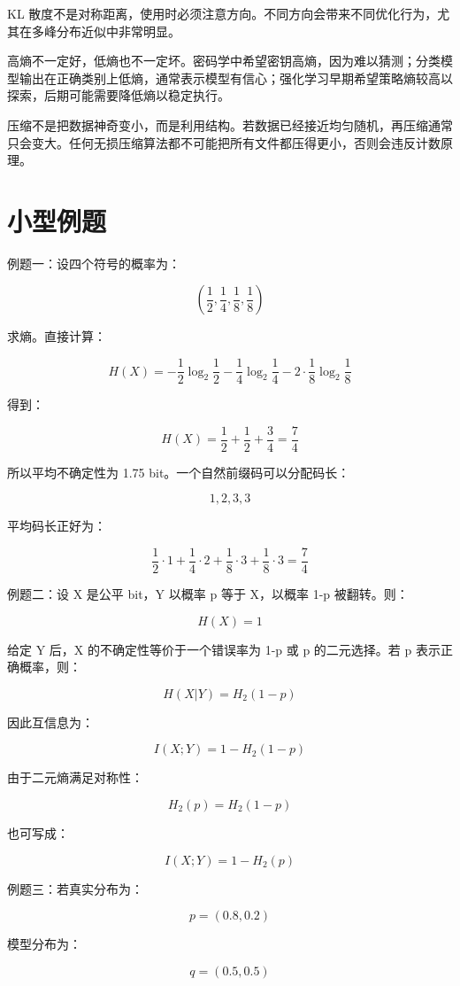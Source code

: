 KL 散度不是对称距离，使用时必须注意方向。不同方向会带来不同优化行为，尤其在多峰分布近似中非常明显。

高熵不一定好，低熵也不一定坏。密码学中希望密钥高熵，因为难以猜测；分类模型输出在正确类别上低熵，通常表示模型有信心；强化学习早期希望策略熵较高以探索，后期可能需要降低熵以稳定执行。

压缩不是把数据神奇变小，而是利用结构。若数据已经接近均匀随机，再压缩通常只会变大。任何无损压缩算法都不可能把所有文件都压得更小，否则会违反计数原理。

\section{小型例题}

例题一：设四个符号的概率为：

\[
\left(\frac{1}{2},\frac{1}{4},\frac{1}{8},\frac{1}{8}\right)
\]

求熵。直接计算：

\[
H(X)=-\frac{1}{2}\log_2\frac{1}{2}-\frac{1}{4}\log_2\frac{1}{4}-2\cdot\frac{1}{8}\log_2\frac{1}{8}
\]

得到：

\[
H(X)=\frac{1}{2}+\frac{1}{2}+\frac{3}{4}=\frac{7}{4}
\]

所以平均不确定性为 1.75 bit。一个自然前缀码可以分配码长：

\[
1,2,3,3
\]

平均码长正好为：

\[
\frac{1}{2}\cdot 1+\frac{1}{4}\cdot 2+\frac{1}{8}\cdot 3+\frac{1}{8}\cdot 3=\frac{7}{4}
\]

例题二：设 X 是公平 bit，Y 以概率 p 等于 X，以概率 1-p 被翻转。则：

\[
H(X)=1
\]

给定 Y 后，X 的不确定性等价于一个错误率为 1-p 或 p 的二元选择。若 p 表示正确概率，则：

\[
H(X|Y)=H_2(1-p)
\]

因此互信息为：

\[
I(X;Y)=1-H_2(1-p)
\]

由于二元熵满足对称性：

\[
H_2(p)=H_2(1-p)
\]

也可写成：

\[
I(X;Y)=1-H_2(p)
\]

例题三：若真实分布为：

\[
p=(0.8,0.2)
\]

模型分布为：

\[
q=(0.5,0.5)
\]

